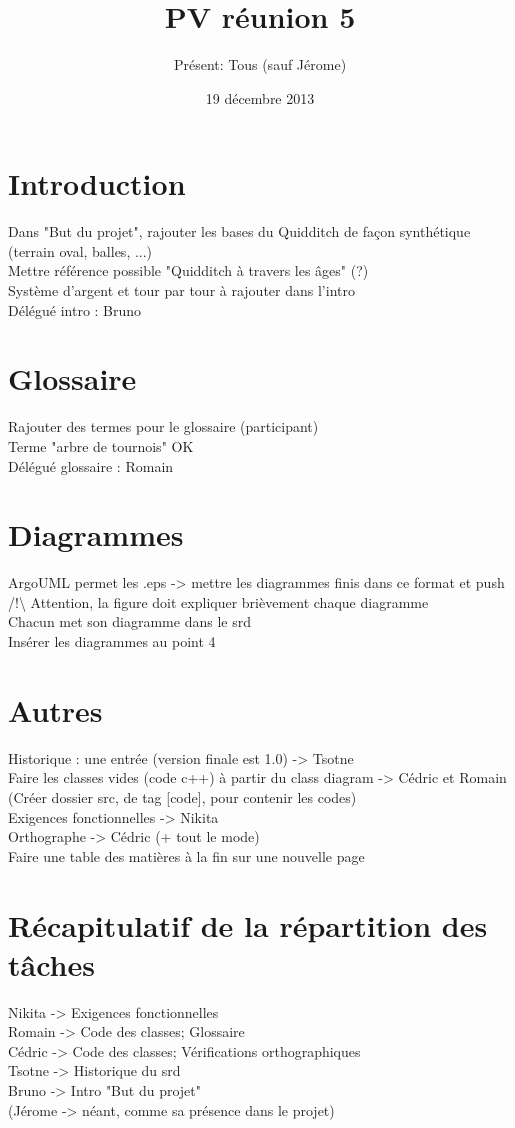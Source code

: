 \documentclass[a4paper,10pt]{article}
\author{Présent: Tous (sauf Jérome)}
\title{PV réunion 5}
\date{19 décembre 2013}
\begin{document}
\maketitle
\part*{Introduction}
Dans "But du projet", rajouter les bases du Quidditch de façon synthétique (terrain oval, balles, ...)\\
Mettre référence possible "Quidditch à travers les âges" (?)\\
Système d'argent et tour par tour à rajouter dans l'intro\\
Délégué intro : Bruno
\part*{Glossaire}
Rajouter des termes pour le glossaire (participant)\\
Terme "arbre de tournois" OK\\
Délégué glossaire : Romain
\part*{Diagrammes}
ArgoUML permet les .eps -> mettre les diagrammes finis dans ce format et push\\
/!\textbackslash{} Attention, la figure doit expliquer brièvement chaque diagramme\\
Chacun met son diagramme dans le srd\\
Insérer les diagrammes au point 4\\
\part*{Autres}
Historique : une entrée (version finale est 1.0) -> Tsotne\\
Faire les classes vides (code c++) à partir du class diagram -> Cédric et Romain\\
(Créer dossier src, de tag [code], pour contenir les codes)\\
Exigences fonctionnelles -> Nikita\\
Orthographe -> Cédric (+ tout le mode)\\
Faire une table des matières à la fin sur une nouvelle page\\
\part*{Récapitulatif de la répartition des tâches}
Nikita -> Exigences fonctionnelles\\
Romain -> Code des classes; Glossaire\\
Cédric -> Code des classes; Vérifications orthographiques\\
Tsotne -> Historique du srd\\
Bruno -> Intro "But du projet"\\
(Jérome -> néant, comme sa présence dans le projet)
\end{document}
